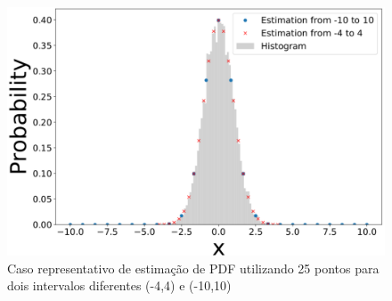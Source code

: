 \begin{figure}[H]
	\centering
	\includegraphics[width=0.8\linewidth]{figuras/linspace2}
	\caption{Caso representativo de estimação de PDF utilizando 25 pontos para dois intervalos diferentes (-4,4) e (-10,10)}
	\label{fig:figura1}
\end{figure}